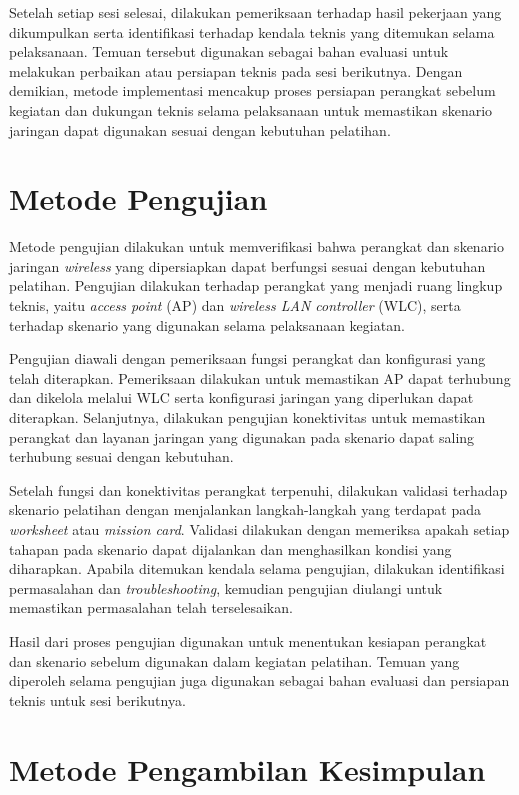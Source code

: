 Setelah setiap sesi selesai, dilakukan pemeriksaan terhadap hasil pekerjaan yang
dikumpulkan serta identifikasi terhadap kendala teknis yang ditemukan selama
pelaksanaan. Temuan tersebut digunakan sebagai bahan evaluasi untuk melakukan
perbaikan atau persiapan teknis pada sesi berikutnya. Dengan demikian, metode
implementasi mencakup proses persiapan perangkat sebelum kegiatan dan dukungan
teknis selama pelaksanaan untuk memastikan skenario jaringan dapat digunakan sesuai
dengan kebutuhan pelatihan.

\section{Metode Pengujian}

Metode pengujian dilakukan untuk memverifikasi bahwa perangkat dan skenario jaringan
\textit{wireless} yang dipersiapkan dapat berfungsi sesuai dengan kebutuhan pelatihan.
Pengujian dilakukan terhadap perangkat yang menjadi ruang lingkup teknis, yaitu
\textit{access point} (AP) dan \textit{wireless LAN controller} (WLC), serta terhadap
skenario yang digunakan selama pelaksanaan kegiatan.

Pengujian diawali dengan pemeriksaan fungsi perangkat dan konfigurasi yang telah
diterapkan. Pemeriksaan dilakukan untuk memastikan AP dapat terhubung dan dikelola
melalui WLC serta konfigurasi jaringan yang diperlukan dapat diterapkan. Selanjutnya,
dilakukan pengujian konektivitas untuk memastikan perangkat dan layanan jaringan yang
digunakan pada skenario dapat saling terhubung sesuai dengan kebutuhan.

Setelah fungsi dan konektivitas perangkat terpenuhi, dilakukan validasi terhadap
skenario pelatihan dengan menjalankan langkah-langkah yang terdapat pada
\textit{worksheet} atau \textit{mission card}. Validasi dilakukan dengan memeriksa
apakah setiap tahapan pada skenario dapat dijalankan dan menghasilkan kondisi yang
diharapkan. Apabila ditemukan kendala selama pengujian, dilakukan identifikasi
permasalahan dan \textit{troubleshooting}, kemudian pengujian diulangi untuk
memastikan permasalahan telah terselesaikan.

Hasil dari proses pengujian digunakan untuk menentukan kesiapan perangkat dan
skenario sebelum digunakan dalam kegiatan pelatihan. Temuan yang diperoleh selama
pengujian juga digunakan sebagai bahan evaluasi dan persiapan teknis untuk sesi
berikutnya.

\section{Metode Pengambilan Kesimpulan}

